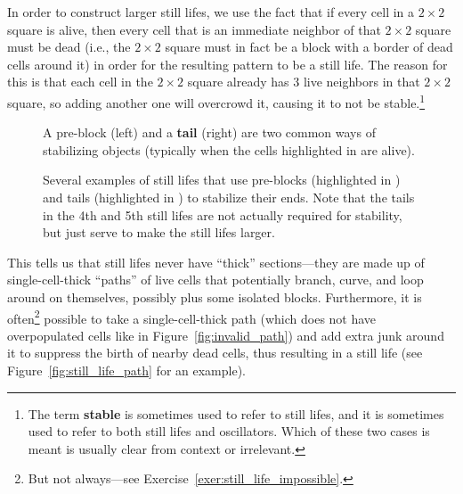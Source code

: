 In order to construct larger still lifes, we use the fact that if every cell in a $2 \times 2$ square is alive, then every cell that is an immediate neighbor of that $2 \times 2$ square must be dead (i.e., the $2 \times 2$ square must in fact be a block with a border of dead cells around it) in order for the resulting pattern to be a still life. The reason for this is that each cell in the $2 \times 2$ square already has $3$ live neighbors in that $2 \times 2$ square, so adding another one will overcrowd it, causing it to not be stable.\footnote{The term \textbf{stable} is sometimes used to refer to still lifes, and it is sometimes used to refer to both still lifes and oscillators. Which of these two cases is meant is usually clear from context or irrelevant.}

\begin{figure}[!htb]
	\centering
	\begin{minipage}[b]{.31\textwidth}
		\centering
		\caption{A pre-block (left) and a \textbf{tail} (right) are two common ways of stabilizing objects (typically when the cells highlighted in  are alive).}
		\label{fig:hook_tail}
	\end{minipage} \quad %
	\begin{minipage}[b]{.64\textwidth}
		\centering
		\caption{Several examples of still lifes that use pre-blocks (highlighted in ) and tails (highlighted in ) to stabilize their ends. Note that the tails in the 4th and 5th still lifes are not actually required for stability, but just serve to make the still lifes larger.}
		\label{fig:hook_tail_examples}
	\end{minipage}
\end{figure}

This tells us that still lifes never have ``thick'' sections---they are made up of single-cell-thick ``paths'' of live cells that potentially branch, curve, and loop around on themselves, possibly plus some isolated blocks. Furthermore, it is often\footnote{But not always---see Exercise~\ref{exer:still_life_impossible}.} possible to take a single-cell-thick path (which does not have overpopulated cells like in Figure~\ref{fig:invalid_path}) and add extra junk around it to suppress the birth of nearby dead cells, thus resulting in a still life (see Figure~\ref{fig:still_life_path} for an example).

